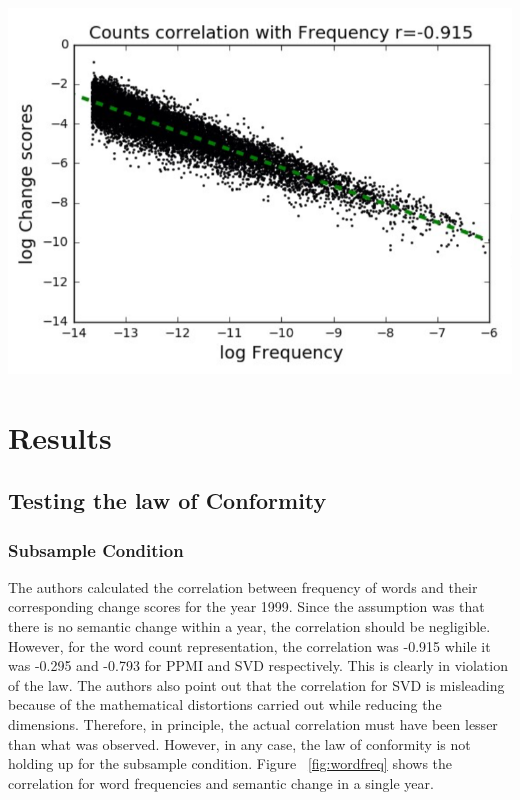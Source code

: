 \documentclass[a0,landscape]{a0poster}
\begin{document}
\begin{multicols}{4}
\begin{center}\vspace{1cm}
  \includegraphics[width=0.8\linewidth]{image2.png}
  \label{fig:wordfreq}
\end{center}\vspace{1cm}
 


\section*{Results}
\subsection*{Testing the law of Conformity} 

\subsubsection*{Subsample Condition} 
The authors calculated the correlation between frequency of words and their corresponding change scores for the year 1999. Since the assumption was that there is no semantic change within a year, the correlation should be negligible. However, for the word count representation, the correlation was -0.915 while it was -0.295 and -0.793 for PPMI and SVD respectively. This is clearly in violation of the law. The authors also point out that the correlation for SVD is misleading because of the mathematical distortions carried out while reducing the dimensions. Therefore, in principle, the actual correlation must have been lesser than what was observed. However, in any case, the law of conformity is not holding up for the subsample condition. Figure ~\ref{fig:wordfreq} shows the correlation for word frequencies and semantic change in a single year.



\end{multicols}
\end{document}
